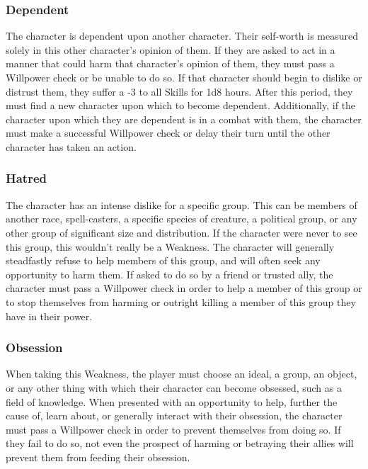 \documentclass[oneside]{book}
\begin{document}
\begin{multicols}{2}
\subsubsection{Dependent}
The character is dependent upon another character. Their self-worth is measured solely in this other character's opinion of them. If they are asked to act in a manner that could harm that character's opinion of them, they must pass a Willpower check or be unable to do so. If that character should begin to dislike or distrust them, they suffer a -3 to all Skills for 1d8 hours. After this period, they must find a new character upon which to become dependent. Additionally, if the character upon which they are dependent is in a combat with them, the character must make a successful Willpower check or delay their turn until the other character has taken an action. 

\subsubsection{Hatred}
The character has an intense dislike for a specific group. This can be members of another race, spell-casters, a specific species of creature, a political group, or any other group of significant size and distribution. If the character were never to see this group, this wouldn't really be a Weakness. The character will generally steadfastly refuse to help members of this group, and will often seek any opportunity to harm them. If asked to do so by a friend or trusted ally, the character must pass a Willpower check in order to help a member of this group or to stop themselves from harming or outright killing a member of this group they have in their power.
\subsubsection{Obsession}
When taking this Weakness, the player must choose an ideal, a group, an object, or any other thing with which their character can become obsessed, such as a field of knowledge. When presented with an opportunity to help, further the cause of, learn about, or generally interact with their obsession, the character must pass a Willpower check in order to prevent themselves from doing so. If they fail to do so, not even the prospect of harming or betraying their allies will prevent them from feeding their obsession. 

\end{multicols}
\end{document}
